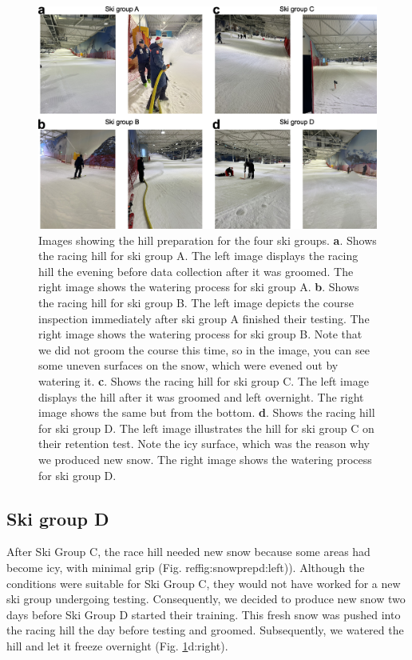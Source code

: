 \documentclass[pdflatex,sn-nature]{sn-jnl}%
\theoremstyle{thmstyleone}%
\theoremstyle{thmstyletwo}%
\theoremstyle{thmstylethree}%
\begin{document}
\begin{appendices}
\begin{figure}[H]
\centering
\includegraphics[width=\linewidth]{figures/figure_appendix_snowprep.jpg}
\caption{Images showing the hill preparation for the four ski groups. \textbf{a}. Shows the racing hill for ski group A. The left image displays the racing hill the evening before data collection after it was groomed. The right image shows the watering process for ski group A. \textbf{b}. Shows the racing hill for ski group B. The left image depicts the course inspection immediately after ski group A finished their testing. The right image shows the watering process for ski group B. Note that we did not groom the course this time, so in the image, you can see some uneven surfaces on the snow, which were evened out by watering it. \textbf{c}. Shows the racing hill for ski group C. The left image displays the hill after it was groomed and left overnight. The right image shows the same but from the bottom. \textbf{d}. Shows the racing hill for ski group D. The left image illustrates the hill for ski group C on their retention test. Note the icy surface, which was the reason why we produced new snow. The right image shows the watering process for ski group D. 
}
\label{fig:snowprep}
\end{figure}
 
\subsection*{Ski group D}
After Ski Group C, the race hill needed new snow because some areas had become icy, with minimal grip (Fig. ref{fig:snowprep}d:left)). Although the conditions were suitable for Ski Group C, they would not have worked for a new ski group undergoing testing. Consequently, we decided to produce new snow two days before Ski Group D started their training. This fresh snow was pushed into the racing hill the day before testing and groomed. Subsequently, we watered the hill and let it freeze overnight (Fig. \ref{fig:snowprep}d:right).



\end{appendices}
\end{document}

